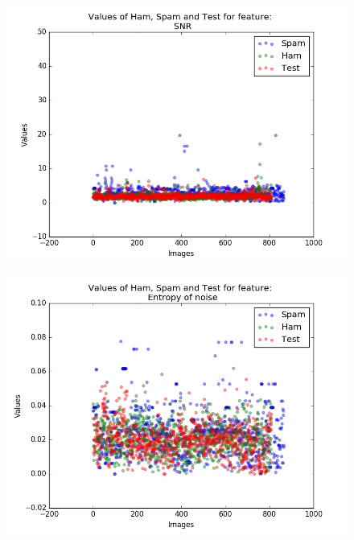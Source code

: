 \begin{figure}[h]
	\centering
	\begin{minipage}{.5\textwidth}
		\centering
		\includegraphics[width=\linewidth]{images/appA/SNR_values_scatter}
		\label{fig:snr_values_scatter}
	\end{minipage}%
	\begin{minipage}{.5\textwidth}
		\centering
		\includegraphics[width=\linewidth]{images/appA/Entropyofnoise_values_scatter}
		\label{fig:Entropyofnoise_values_scatter}
	\end{minipage}
\end{figure}